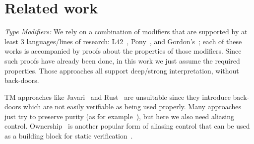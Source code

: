 
\saveSpace
\section{Related work}
\label{s:related}
\saveSpace

\textit{Type Modifiers:}
We rely on a combination of modifiers that are supported by at least 3 languages/lines of research:
L42~\cite{ServettoZucca15,ServettoEtAl13a,JOT:issue_2011_01/article1,GianniniEtAl16},
Pony~\cite{clebsch2015deny,clebsch2017orca}, and Gordon's~\cite{GordonEtAl12}; 
each of these works is accompanied by proofs about the properties of those modifiers.
Since such proofs have already been done, in this work we just assume the required properties.
Those approaches all support deep/strong interpretation, without back-doors.

TM approaches like Javari~\cite{TschantzErnst05,Boyland06} and Rust~\cite{matsakis2014rust} are unsuitable since they introduce back-doors which are not easily verifiable as being used properly.
Many approaches just try to preserve purity (as for example~\cite{pearce2011jpure}), but here we also need aliasing control.
Ownership~\cite{ClarkeEtAl13,ZibinEtAl10,DietlEtAl07} is another popular form of aliasing control that can be used as a building block for static verification~\cite{%
muller2002modular,%
barnett2011specification%
}.


